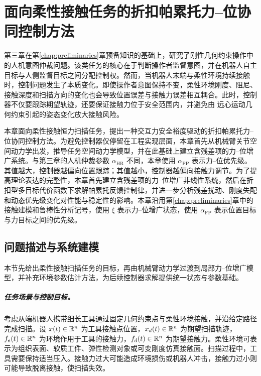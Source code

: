 \chapter{面向柔性接触任务的折扣帕累托力--位协同控制方法}
\label{chap:flexible_pareto_contact}

第三章在第\ref{chap:preliminaries}章预备知识的基础上，研究了刚性几何约束操作中的人机意图仲裁问题。该类任务的核心在于判断操作者监督意图，并在机器人自主目标与人侧监督目标之间分配控制权。然而，当机器人末端与柔性环境持续接触时，控制问题发生了本质变化。即使操作者意图保持不变，柔性环境刚度、阻尼、接触深度和扫描方向的变化也会导致位置误差与接触力误差相互耦合。此时，控制器不仅要跟踪期望轨迹，还要保证接触力位于安全范围内，并避免由 远心运动几何约束引起的姿态变化放大接触风险。

本章面向柔性接触恒力扫描任务，提出一种交互力安全裕度驱动的折扣帕累托力--位协同控制方法。为避免控制器仅停留在工程实现层面，本章首先从机械臂关节空间动力学出发，推导任务空间动力学模型，并在此基础上建立含残差项的力--位增广系统。与第三章的人机仲裁参数 $\alpha_{\mathrm{HR}}$ 不同，本章使用 $\alpha_{\mathrm{FP}}$ 表示力--位优先级。其值越大，控制器越偏向位置跟踪；其值越小，控制器越偏向接触力调节。为了提高理论表达的完整性，本章首先建立含残差项的力--位增广非线性系统，然后在折扣型多目标代价函数下求解帕累托反馈控制律，并进一步分析残差扰动、刚度失配和动态优先级变化对性能与稳定性的影响。本章沿用第\ref{chap:preliminaries}章中的接触建模和鲁棒性分析记号，使用 $\xi$ 表示力--位增广状态，使用 $\alpha_{\mathrm{FP}}$ 表示位置目标与力目标之间的优先级。

\section{问题描述与系统建模}
\label{sec:ch4_problem}

本节先给出柔性接触扫描任务的目标，再由机械臂动力学过渡到局部力--位增广模型，并补充环境参数估计方法，为后续控制器求解提供统一状态与参数基础。

\paragraph{任务场景与控制目标。}
\label{subsec:ch4_task}

考虑从端机器人携带细长工具通过固定几何约束点与柔性环境接触，并沿给定路径完成扫描。设 $x(t)\in\mathbb{R}^n$ 为工具接触点位置，$x_d(t)\in\mathbb{R}^n$ 为期望扫描轨迹，$f_e(t)\in\mathbb{R}^n$ 为环境作用于工具的接触力，$f_d(t)\in\mathbb{R}^n$ 为期望接触力。柔性环境可表示为组织表面、软质工件、弹性检测对象或可变刚度仿真接触面。扫描过程中，工具需要保持适当压入。接触力过大可能造成环境损伤或机器人冲击，接触力过小则可能导致脱离接触，使扫描失效。

